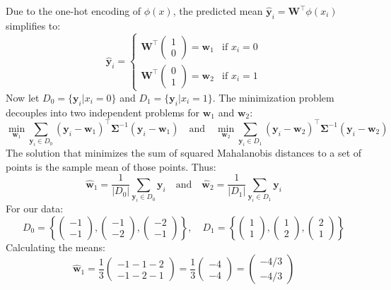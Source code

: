 \documentclass[11pt, a4paper, oneside]{memoir}
\begin{document}
Due to the one-hot encoding of $\phi(x)$, the predicted mean $\hat{\mathbf{y}}_i = \mathbf{W}^\top\phi(x_i)$ simplifies to:
\[
    \hat{\mathbf{y}}_i =
    \begin{cases}
        \mathbf{W}^\top\begin{pmatrix} 1 \\ 0 \end{pmatrix} = \mathbf{w}_1 & \text{if } x_i = 0 \\
        \mathbf{W}^\top\begin{pmatrix} 0 \\ 1 \end{pmatrix} = \mathbf{w}_2 & \text{if } x_i = 1
    \end{cases}
\]
Now let $D_0 = \{\mathbf{y}_i | x_i=0\}$ and $D_1 = \{\mathbf{y}_i | x_i=1\}$.
The minimization problem decouples into two independent problems for $\mathbf{w}_1$ and $\mathbf{w}_2$:
\[ \min_{\mathbf{w}_1} \sum_{\mathbf{y}_i \in D_0} (\mathbf{y}_i - \mathbf{w}_1)^\top\mathbf{\Sigma}^{-1}(\mathbf{y}_i - \mathbf{w}_1) \quad \text{and} \quad \min_{\mathbf{w}_2} \sum_{\mathbf{y}_i \in D_1} (\mathbf{y}_i - \mathbf{w}_2)^\top\mathbf{\Sigma}^{-1}(\mathbf{y}_i - \mathbf{w}_2) \]
The solution that minimizes the sum of squared Mahalanobis distances to a set of points is the sample mean of those points. Thus:
\[ \hat{\mathbf{w}}_1 = \frac{1}{|D_0|} \sum_{\mathbf{y}_i \in D_0} \mathbf{y}_i \quad \text{and} \quad \hat{\mathbf{w}}_2 = \frac{1}{|D_1|} \sum_{\mathbf{y}_i \in D_1} \mathbf{y}_i \]
For our data:
\[ D_0 = \left\{ \begin{pmatrix} -1 \\ -1 \end{pmatrix}, \begin{pmatrix} -1 \\ -2 \end{pmatrix}, \begin{pmatrix} -2 \\ -1 \end{pmatrix} \right\}, \quad D_1 = \left\{ \begin{pmatrix} 1 \\ 1 \end{pmatrix}, \begin{pmatrix} 1 \\ 2 \end{pmatrix}, \begin{pmatrix} 2 \\ 1 \end{pmatrix} \right\} \]
Calculating the means:
\[ \hat{\mathbf{w}}_1 = \frac{1}{3} \begin{pmatrix} -1-1-2 \\ -1-2-1 \end{pmatrix} = \frac{1}{3} \begin{pmatrix} -4 \\ -4 \end{pmatrix} = \begin{pmatrix} -4/3 \\ -4/3 \end{pmatrix} \]
\end{document}
